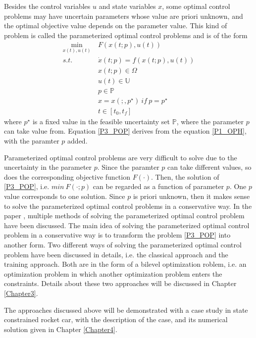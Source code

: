 \documentclass  [
  paper    = a4,
  BCOR     = 10mm,
  twoside,
  fontsize = 12pt,
  fleqn,
  toc      = bibnumbered,
  toc      = listofnumbered,
  numbers  = noendperiod,
  headings = normal,
  listof   = leveldown,
  version  = 3.03
]                                       {scrreprt}
\newcommand{\<}{\langle}
\renewcommand{\>}{\rangle}
\begin{document}
Besides the control variables $u$ and state variables $x$, some optimal control problems may have  uncertain parameters whose value are priori unknown, and the optimal objective value depends on the parameter value. This kind of problem is called the parameterized optimal control problems and is of the form 
      \begin{equation}
	\begin{aligned}
	\underset{x(t), u(t)}{\text{min}}  \ &  F(x(t;p), u(t)) \\
	s.t.\ \  &  \dot{x} (t;p) = f(x(t;p), u(t))\\ 
	& x(t;p) \in \Omega \\
	& u(t) \in \mathbb{U}  \\
	& p  \in   \mathbb{P}  \\
	& x = x(;,p^\star) \ if \ p = p^\star \\
	& t \in [t_0, t_f]
\end{aligned}
\label{P3_POP}
\end{equation}
where $p^\star$ is a fixed value in the feasible uncertainty set $ \mathbb{P}$, where the parameter $p$ can take value from. Equation \ref{P3_POP} derives from the equation \ref{P1_OPH}, with the paramter $p$ added.  

Parameterized optimal control problems are very difficult to solve due to the uncertainty in the parameter $p$. Since the paramter $p$ can take different values, so does the corresponding  objective function $F(\cdot)$. Then, the solution of \ref{P3_POP},  i.e. $min \  F(\cdot; p)$ can be regarded as a function of parameter $p$. One $p$ value corresponds to one solution. Since $p$ is priori unknown, then it makes sense to solve the parameterized optimal control problems in a conservative way. In the paper \cite{MatSch22}, multiple methods of solving the parameterized optimal control problem have been discussed. The main idea of solving the parameterized optimal control problem in a conservative way is to transform the problem \ref{P3_POP} into another form. Two different ways of solving the parameterized optimal control problem have been discussed in details, i.e. the classical approach and the training approach. Both are in the form of a bilevel optimization roblem, i.e. an optimization problem in which another optimization problem enters the constraints. Details about these two approaches will be discussed in Chapter \ref{Chapter3}. 

The approaches discussed above will be demonstrated with a case study in state constrained rocket car, with the description of the case, and its numerical solution given in Chapter \ref{Chapter4}.  
\end{document}
